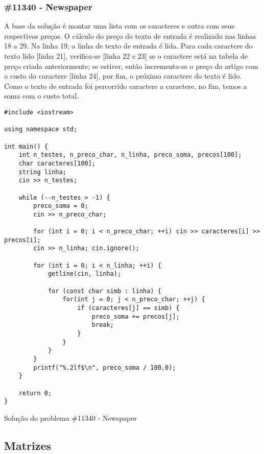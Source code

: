 \documentclass[a4paper,12pt]{scrartcl}
\begin{document}
\subsubsection{\#11340 - Newspaper}
A base da solução é montar uma lista com os caracteres e outra com seus respectivos preços. O cálculo do preço do texto de entrada é realizado nas linhas 18 a 29. Na linha 19, a linha de texto de entrada é lida. Para cada caractere do texto lido [linha 21], verifica-se [linha 22 e 23] se o caractere está na tabela de preço criada anteriormente; se estiver, então incrementa-se o preço do artigo com o custo do caractere [linha 24], por fim, o próximo caractere do texto é lido. Como o texto de entrada foi percorrido caractere a caractere, no fim, temos a soma com o custo total.
\begin{listing}[H]
\begin{verbatim}
#include <iostream>

using namespace std;

int main() {
    int n_testes, n_preco_char, n_linha, preco_soma, precos[100];
    char caracteres[100];
    string linha;
    cin >> n_testes;

    while (--n_testes > -1) {
        preco_soma = 0;
        cin >> n_preco_char;

        for (int i = 0; i < n_preco_char; ++i) cin >> caracteres[i] >> precos[i];
        cin >> n_linha; cin.ignore();

        for (int i = 0; i < n_linha; ++i) {
            getline(cin, linha);

            for (const char simb : linha) {
                for(int j = 0; j < n_preco_char; ++j) {
                    if (caracteres[j] == simb) {
                        preco_soma += precos[j];
                        break;
                    }
                }
            }
        }
        printf("%.2lf$\n", preco_soma / 100.0);
    }

    return 0;
}
\end{verbatim}
\caption{\footnotesize{Solução do problema \#11340 - Newspaper}}
\end{listing}

\subsection{Matrizes}
\end{document}
